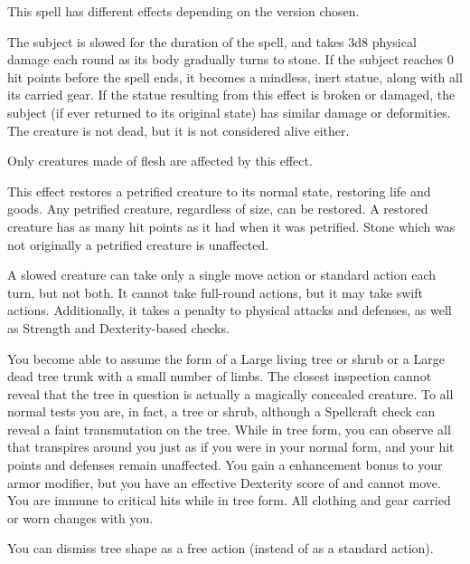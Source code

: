 \begin{spelleffect}
    This spell has different effects depending on the version chosen.
    \par {} The subject is slowed for the duration of the spell, and takes 3d8 physical damage each round as its body gradually turns to stone. If the subject reaches 0 hit points before the spell ends, it becomes a mindless, inert statue, along with all its carried gear. If the statue resulting from this effect is broken or damaged, the subject (if ever returned to its original state) has similar damage or deformities. The creature is not dead, but it is not considered alive either.
    \par Only creatures made of flesh are affected by this effect.
    \par {} This effect restores a petrified creature to its normal state, restoring life and goods. Any petrified creature, regardless of size, can be restored. A restored creature has as many hit points as it had when it was petrified. Stone which was not originally a petrified creature is unaffected.
\end{spelleffect}
\begin{spellnotes}
    A slowed creature can take only a single move action or standard action each turn, but not both. It cannot take full-round actions, but it may take swift actions. Additionally, it takes a  penalty to physical attacks and defenses, as well as Strength and Dexterity-based checks.
\end{spellnotes}

\spelldur{\durext \dismissable}
\begin{spelleffect}
    You become able to assume the form of a Large living tree or shrub or a Large dead tree trunk with a small number of limbs. The closest inspection cannot reveal that the tree in question is actually a magically concealed creature. To all normal tests you are, in fact, a tree or shrub, although a Spellcraft check can reveal a faint transmutation on the tree. While in tree form, you can observe all that transpires around you just as if you were in your normal form, and your hit points and defenses remain unaffected. You gain a  enhancement bonus to your armor modifier, but you have an effective Dexterity score of  and cannot move. You are immune to critical hits while in tree form. All clothing and gear carried or worn changes with you.
\end{spelleffect}
\begin{spellnotes}
    You can dismiss tree shape as a free action (instead of as a standard action).
\end{spellnotes}


